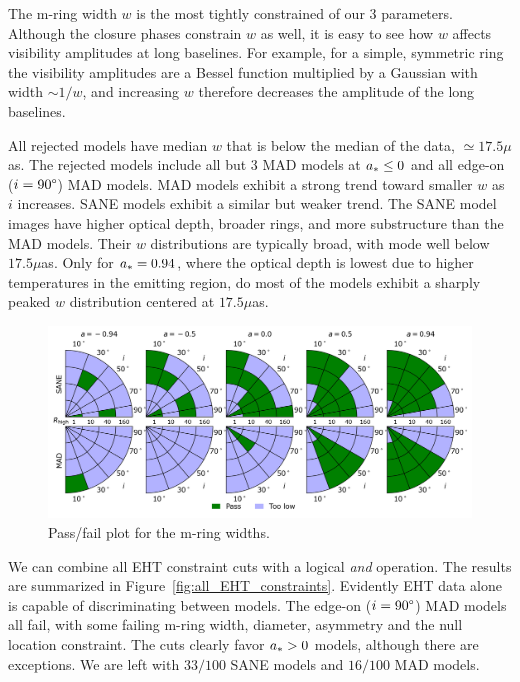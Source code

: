 
The m-ring width $w$ is the most tightly constrained of our 3 parameters.  Although the closure phases constrain $w$ as well, it is easy to see how $w$ affects visibility amplitudes at long baselines.  For example, for a simple, symmetric ring the visibility amplitudes are a Bessel function multiplied by a Gaussian with width $\sim 1/w$, and increasing $w$ therefore decreases the amplitude of the long baselines.

All rejected models have median $w$ that is below the median of the data, $ \simeq 17.5\mu$as. The rejected models include all but 3 MAD models at $a_* \le 0$ and all edge-on ($i = 90\degree$) MAD models.  MAD models exhibit a strong trend toward smaller $w$ as $i$ increases.  SANE models exhibit a similar but weaker trend. The SANE model images have  higher optical depth, broader rings, and more substructure than the MAD models.  Their $w$ distributions are typically broad, with mode well below $17.5\mu$as.  Only for $a_* = 0.94$, where the optical depth is lowest due to higher temperatures in the emitting region, do most of the models exhibit a sharply peaked $w$ distribution centered at $17.5\mu$as.

\begin{figure}
 \centering
 \includegraphics[width=\textwidth]{./figures/Mring_w_Constraints.png}
  \caption{Pass/fail plot for the m-ring widths.}
\end{figure}


We can combine all EHT constraint cuts with a logical {\em and} operation.  The results are summarized in Figure~\ref{fig:all_EHT_constraints}.  Evidently EHT data alone is capable of discriminating between models.   The edge-on ($i = 90\degree$) MAD models all fail, with some failing m-ring width, diameter, asymmetry and the null location constraint.  The cuts clearly favor $a_* > 0$ models, although there are exceptions.  We are left with $33/100$ SANE models and $16/100$ MAD models.


